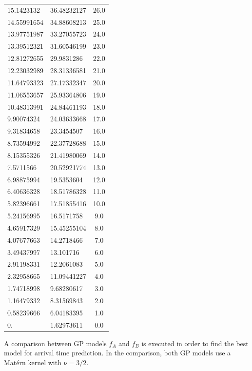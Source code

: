 \begin{table}
\begin{tabular}{ |l|l|c| }
        15.1423132 & 36.48232127 & 26.0 \\
        14.55991654 & 34.88608213 & 25.0 \\
        13.97751987 & 33.27055723 & 24.0 \\
        13.39512321 & 31.60546199 & 23.0 \\
        12.81272655 & 29.9831286 & 22.0 \\
        12.23032989 & 28.31336581 & 21.0 \\
        11.64793323 & 27.17332347 & 20.0 \\
        11.06553657 & 25.93364806 & 19.0 \\
        10.48313991 & 24.84461193 & 18.0 \\
        9.90074324 & 24.03633668 & 17.0 \\
        9.31834658 & 23.3454507 & 16.0 \\
        8.73594992 & 22.37728688 & 15.0 \\
        8.15355326 & 21.41980069 & 14.0 \\
        7.5711566 & 20.52921774 & 13.0 \\
        6.98875994 & 19.5353604 & 12.0 \\
        6.40636328 & 18.51786328 & 11.0 \\
        5.82396661 & 17.51855416 & 10.0 \\
        5.24156995 & 16.5171758 & 9.0 \\
        4.65917329 & 15.45255104 & 8.0 \\
        4.07677663 & 14.2718466 & 7.0 \\
        3.49437997 & 13.101716 & 6.0 \\
        2.91198331 & 12.2061083 & 5.0 \\
        2.32958665 & 11.09441227 & 4.0 \\
        1.74718998 & 9.68280617 & 3.0 \\
        1.16479332 & 8.31569843 & 2.0 \\
        0.58239666 & 6.04183395 & 1.0 \\
        0. & 1.62973611 & 0.0 \\
        \hline
    \end{tabular}
\end{table}

A comparison between GP models $f_A$ and $f_B$ is executed in order to find the best model for arrival time prediction.
In the comparison, both GP models use a Matérn kernel with $\nu =3/2$.

